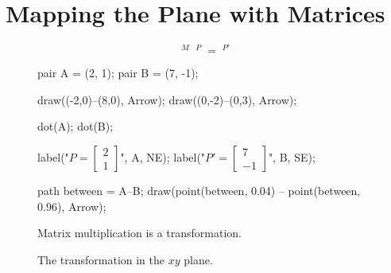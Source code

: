 \documentclass[../textbook.tex]{subfiles}
\begin{document}
\section{Mapping the Plane with Matrices}

\begin{figure}[h]
	\begin{center}
		\begin{minipage}[b]{0.45\textwidth}
			\centering
			$$\mathop{\left[ \begin{array}{cc} 2 & 3 \\ -1 & 1 \end{array}\right]}^{M}
			\mathop{\left[ \begin{array}{c} 2 \\ 1 \end{array}\right]}^{P} = \mathop{\left[ \begin{array}{c} 7 \\ -1 \end{array} \right]}^{P'}$$
			\vspace*{0.5\baselineskip}
		\end{minipage}
		\hfill
		\begin{minipage}[b]{0.45\textwidth}
			\centering
			\begin{asy}[width=0.7\textwidth]
				pair A = (2, 1);
				pair B = (7, -1);
				
				draw((-2,0)--(8,0), Arrow);
				draw((0,-2)--(0,3), Arrow);
				
				dot(A);
				dot(B);
				
				label("$P=\left[ \begin{array}{c} 2 \\ 1 \end{array}\right]$", A, NE);
				label("$P'=\left[ \begin{array}{c} 7 \\ -1 \end{array} \right]$", B, SE);
				
				path between = A--B;
				draw(point(between, 0.04) -- point(between, 0.96), Arrow);
			\end{asy}
		\end{minipage}
	\end{center}
	\vspace*{-2\baselineskip}
	\begin{center}
		\begin{minipage}[t]{0.45\textwidth}
			\caption{Matrix multiplication is a transformation.}
			\label{fig:random_matrix}
		\end{minipage}
		\hfill
		\begin{minipage}[t]{0.45\textwidth}
			\caption{The transformation in the $xy$ plane.}
			\label{fig:geo_interp}
		\end{minipage}
	\end{center}
	\vspace*{-2\baselineskip}
\end{figure}
\end{document}
